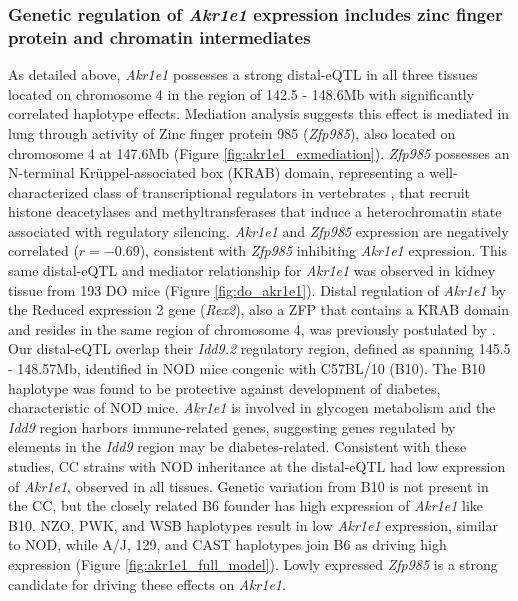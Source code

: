\documentclass[9pt,twocolumn,twoside]{gsajnl}
\begin{document}
\subsubsection{Genetic regulation of \textit{Akr1e1} expression includes zinc finger protein and chromatin intermediates}
As detailed above, \textit{Akr1e1} possesses a strong distal-eQTL in all three tissues located on chromosome 4 in the region of 142.5 - 148.6Mb with significantly correlated haplotype effects. Mediation analysis suggests this effect is mediated in lung through activity of Zinc finger protein 985 (\textit{Zfp985}), also located on chromosome 4 at 147.6Mb (Figure \ref{fig:akr1e1_exmediation}). 
\textit{Zfp985} possesses an N-terminal Kr{\"u}ppel-associated box (KRAB) domain, representing a well-characterized class of transcriptional regulators in vertebrates \citep{Ecco2017}, that recruit histone deacetylases and methyltransferases that induce a heterochromatin state associated with regulatory silencing. 
\textit{Akr1e1} and \textit{Zfp985} expression are negatively correlated ($r = -0.69$), consistent with \textit{Zfp985} inhibiting \textit{Akr1e1} expression. This same distal-eQTL and mediator relationship for \textit{Akr1e1} was observed in kidney tissue from 193 DO mice (Figure \ref{fig:do_akr1e1}).
Distal regulation of \textit{Akr1e1} by the Reduced expression 2 gene (\textit{Rex2}), also a ZFP that contains a KRAB domain and resides in the same region of chromosome 4, was previously postulated by \cite{HamiltonWilliams2013}.
Our distal-eQTL overlap their \textit{Idd9.2} regulatory region, defined as spanning 145.5 - 148.57Mb, \cite{HamiltonWilliams2010} identified in NOD mice congenic with C57BL/10 (B10).
The B10 haplotype was found to be protective against development of diabetes, characteristic of NOD mice.
\textit{Akr1e1} is involved in glycogen metabolism and the \textit{Idd9} region harbors immune-related genes, suggesting genes regulated by elements in the \textit{Idd9} region may be diabetes-related. 
Consistent with these studies, CC strains with NOD inheritance at the distal-eQTL had low expression of \textit{Akr1e1}, observed in all tissues.
Genetic variation from B10 is not present in the CC, but the closely related B6 founder has high expression of \textit{Akr1e1} like B10.
NZO, PWK, and WSB haplotypes result in low \textit{Akr1e1} expression, similar to NOD, while A/J, 129, and CAST haplotypes join B6 as driving high expression (Figure \ref{fig:akr1e1_full_model}). Lowly expressed \textit{Zfp985} is a strong candidate for driving these effects on \textit{Akr1e1}.
  
\end{document}
